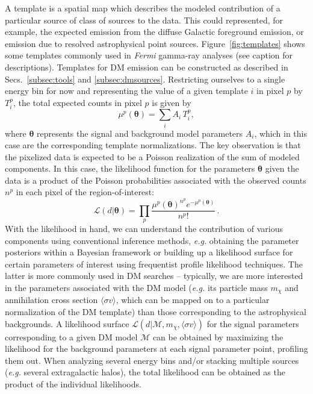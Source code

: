 A template is a spatial map which describes the modeled contribution of a particular source of class of sources to the data. This could represented, for example, the expected emission from the diffuse Galactic foreground emission, or emission due to resolved astrophysical point sources. Figure~\ref{fig:templates} shows some templates commonly used in \emph{Fermi} gamma-ray analyses (see caption for descriptions). Templates for DM emission can be constructed as described in Secs.~\ref{subsec:tools} and \ref{subsec:dmsources}. Restricting ourselves to a single energy bin for now and representing the value of a given template $i$ in pixel $p$ by $T_i^p$, the total expected counts in pixel $p$ is given by 
\begin{equation}
\mu^p(\boldsymbol \theta) = \sum_i A_i\,T_i^p,
\end{equation}
where $\boldsymbol \theta$ represents the signal and background model parameters ${A_i}$, which in this case are the corresponding template normalizations. The key observation is that the pixelized data is expected to be a Poisson realization of the sum of modeled components. In this case, the likelihood function for the parameters $\boldsymbol \theta$ given the data is a product of the Poisson probabilities associated with the observed counts $n^{p}$ in each pixel of the region-of-interest:
\begin{equation}
\mathcal{L}(d | {\boldsymbol \theta}) = \prod_p \frac{\mu^{p}({\boldsymbol \theta})^{n^{p}} e^{-\mu^{p}({\boldsymbol \theta})}}{n^{p}!}\,.
\label{eq:pi}
\end{equation}
With the likelihood in hand, we can understand the contribution of various components using conventional inference methods, \emph{e.g.} obtaining the parameter posteriors within a Bayesian framework or building up a likelihood surface for certain parameters of interest using frequentist profile likelihood techniques. The latter is more commonly used in DM searches -- typically, we are more interested in the parameters associated with the DM model (\emph{e.g.} its particle mass $m_\chi$ and annihilation cross section $\langle\sigma v\rangle$, which can be mapped on to a particular normalization of the DM template) than those corresponding to the astrophysical backgrounds. A likelihood surface $\mathcal{L}(d|\mathcal M, m_\chi, \langle\sigma v\rangle)$ for the signal parameters corresponding to a given DM model $\mathcal M$ can be obtained by maximizing the likelihood for the background parameters at each signal parameter point, profiling them out. When analyzing several energy bins and/or stacking multiple sources (\emph{e.g.} several extragalactic halos), the total likelihood can be obtained as the product of the individual likelihoods.

